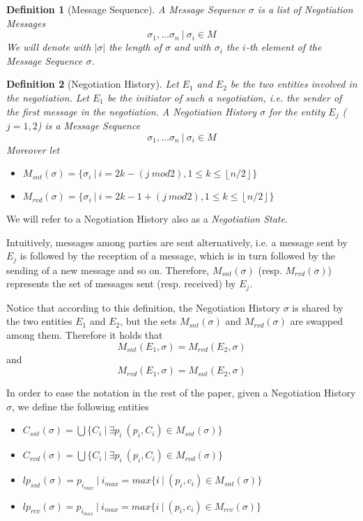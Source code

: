 \documentclass{article}
\newtheorem{definition}{Definition} %
\begin{document}
\begin{definition}[Message Sequence]
A Message Sequence $\sigma$ is a list of Negotiation Messages
$$\sigma_{1}, \ldots \sigma_n\ |\ \sigma_{i} \in M$$
We will denote with $|\sigma|$ the length of $\sigma$ and with $\sigma_i$ the $i$-th element of the Message Sequence $\sigma$.
\end{definition}

\begin{definition}[Negotiation History]
Let $E_{1}$ and $E_{2}$ be the two entities involved in the negotiation. Let $E_{1}$ be the initiator of such a negotiation, i.e. the sender of the first message in the negotiation. A Negotiation History $\sigma$ for the entity $E_{j}$ ($j = 1, 2$) is a Message Sequence
$$\sigma_{1}, \ldots \sigma_{n}\ |\ \sigma_{i} \in M$$
Moreover let
	\begin{itemize}
	\item $M_{snt}(\sigma) = \{ \sigma_{i}\ |\ i = 2k - (j\ mod 2), 1 \leq k \leq \left\lfloor n/2 \right\rfloor \}$
	\item $M_{rvd}(\sigma) = \{ \sigma_{i}\ |\ i = 2k - 1 + (j\ mod 2), 1 \leq k \leq \left\lfloor n/2 \right\rfloor \}$
	\end{itemize}
\end{definition}

We will refer to a Negotiation History also as a \textit{Negotiation State}.

Intuitively, messages among parties are sent alternatively, i.e. a message sent by $E_{j}$ is followed by the reception of a message, which is in turn followed by the sending of a new message and so on. Therefore, $M_{snt}(\sigma)$ (resp. $M_{rvd}(\sigma)$) represents the set of messages sent (resp. received) by $E_{j}$.

Notice that according to this definition, the Negotiation History $\sigma$ is shared by the two entities $E_{1}$ and $E_{2}$, but the sets $M_{snt}(\sigma)$ and $M_{rvd}(\sigma)$ are swapped among them. Therefore it holds that $$ M_{snt}(E_{1}, \sigma) = M_{rvd}(E_{2}, \sigma) $$ and $$ M_{rvd}(E_{1}, \sigma) = M_{snt}(E_{2}, \sigma) $$

In order to ease the notation in the rest of the paper, given a Negotiation History $\sigma$, we define the following entities

\begin{itemize}
\item $C_{snt}(\sigma) = \bigcup\{ C_{i}\ |\ \exists p_{i}\ (p_{i}, C_{i}) \in M_{snt}(\sigma) \}$
\item $C_{rvd}(\sigma) = \bigcup\{ C_{i}\ |\ \exists p_{i}\ (p_{i}, C_{i}) \in M_{rvd}(\sigma) \}$
\item $lp_{snt}(\sigma) = p_{i_{max}}\ |\ i_{max} = max\{i\ |\ (p_{i}, c_{i}) \in M_{snt}(\sigma) \}$
\item $lp_{rcv}(\sigma) = p_{i_{max}}\ |\ i_{max} = max\{i\ |\ (p_{i}, c_{i}) \in M_{rcv}(\sigma) \}$
\end{itemize}
\end{document}
